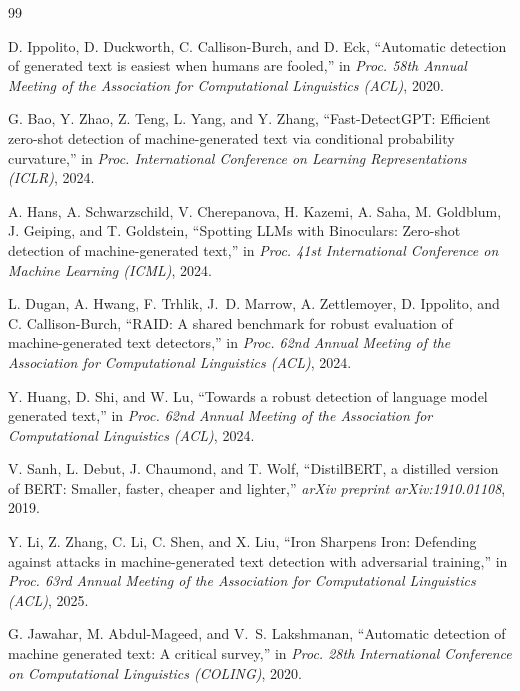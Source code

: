 \documentclass[conference]{IEEEtran}
\begin{document}
\begin{thebibliography}{99}

D. Ippolito, D. Duckworth, C. Callison-Burch, and D. Eck,
``Automatic detection of generated text is easiest when humans are fooled,''
in \textit{Proc. 58th Annual Meeting of the Association for Computational
Linguistics (ACL)}, 2020.



G. Bao, Y. Zhao, Z. Teng, L. Yang, and Y. Zhang,
``Fast-DetectGPT: Efficient zero-shot detection of machine-generated text
via conditional probability curvature,''
in \textit{Proc. International Conference on Learning Representations
(ICLR)}, 2024.



A. Hans, A. Schwarzschild, V. Cherepanova, H. Kazemi, A. Saha,
M. Goldblum, J. Geiping, and T. Goldstein,
``Spotting LLMs with Binoculars: Zero-shot detection of machine-generated
text,''
in \textit{Proc. 41st International Conference on Machine Learning (ICML)},
2024.



L. Dugan, A. Hwang, F. Trhlik, J.~D. Marrow, A. Zettlemoyer,
D. Ippolito, and C. Callison-Burch,
``RAID: A shared benchmark for robust evaluation of machine-generated
text detectors,''
in \textit{Proc. 62nd Annual Meeting of the Association for Computational
Linguistics (ACL)}, 2024.



Y. Huang, D. Shi, and W. Lu,
``Towards a robust detection of language model generated text,''
in \textit{Proc. 62nd Annual Meeting of the Association for Computational
Linguistics (ACL)}, 2024.



V. Sanh, L. Debut, J. Chaumond, and T. Wolf,
``DistilBERT, a distilled version of BERT: Smaller, faster, cheaper and
lighter,''
\textit{arXiv preprint arXiv:1910.01108}, 2019.



Y. Li, Z. Zhang, C. Li, C. Shen, and X. Liu,
``Iron Sharpens Iron: Defending against attacks in machine-generated text
detection with adversarial training,''
in \textit{Proc. 63rd Annual Meeting of the Association for Computational
Linguistics (ACL)}, 2025.



G. Jawahar, M. Abdul-Mageed, and V.~S. Lakshmanan,
``Automatic detection of machine generated text: A critical survey,''
in \textit{Proc. 28th International Conference on Computational Linguistics
(COLING)}, 2020.




\end{thebibliography}
\end{document}
